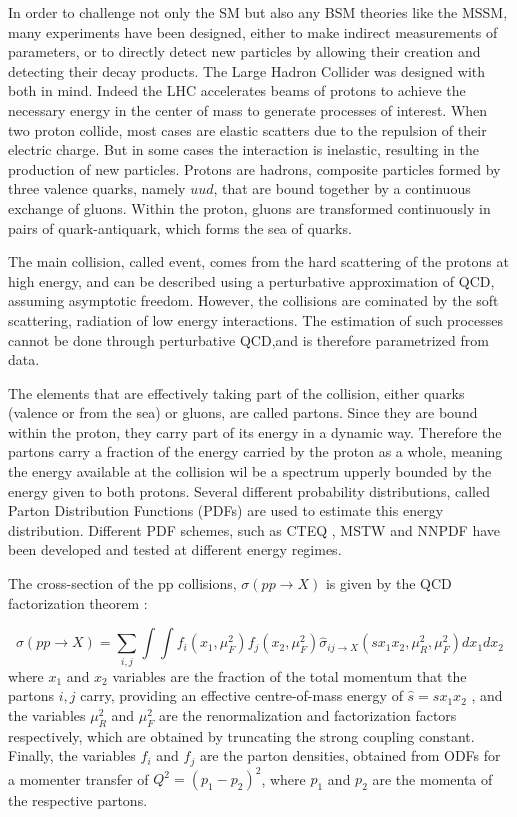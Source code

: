 In order to challenge not only the SM but also any BSM theories like the MSSM, many experiments have been designed, either to make indirect measurements of parameters, or to directly detect new particles by allowing their creation and detecting their decay products. The Large Hadron Collider was designed with both in mind. Indeed the LHC accelerates beams of protons to achieve the necessary energy in the center of mass to generate processes of interest. When two proton collide, most cases are elastic scatters due to the repulsion of their electric charge. But in some cases the interaction is inelastic, resulting in the production of new particles. Protons are hadrons, composite particles formed by three valence quarks, namely $uud$, that are bound together by a continuous exchange of gluons. Within the proton, gluons are transformed continuously in pairs of quark-antiquark, which forms the sea of quarks.

The main collision, called event, comes from the hard scattering of the protons at high energy, and can be described using a perturbative approximation of QCD, assuming asymptotic freedom. However, the collisions are cominated by the soft scattering, radiation of low energy interactions. The estimation of such processes cannot be done through perturbative QCD,and is therefore parametrized from data.

The elements that are effectively taking part of the collision, either quarks (valence or from the sea) or gluons,  are called partons. Since they are bound within the proton, they carry part of its energy in a dynamic way. Therefore the partons carry a fraction of the energy carried by the proton as a whole, meaning the energy available at the collision wil be a spectrum upperly bounded by the energy given to both protons. Several different probability distributions, called Parton Distribution Functions (PDFs) are used to estimate this energy distribution. Different PDF schemes, such as CTEQ \cite{Pumplin:2002vw}, MSTW \cite{Martin:2009iq} and NNPDF \cite{Ball:2008by} have been developed and tested at different energy regimes.

The cross-section of the pp collisions, $\sigma(pp\rightarrow X)$ is given by the QCD factorization theorem \cite{Butterworth:2012fj}:

\begin{equation}
    \sigma(pp\rightarrow X) = \sum_{i,j} \int \int f_i (x_1 , \mu_F^2 )f_j (x_2 , \mu_F^2 ) \hat{\sigma}_{ij \rightarrow X} (s x_1 x_2 , \mu_R^2 , \mu_F^2 ) dx_1 dx_2 
\end{equation}
where $x_1$ and $x_2$ variables are the fraction of the total momentum that the partons $i,j$ carry, providing an effective centre-of-mass energy of $\hat{s} = sx_1 x_2$ , and the variables $\mu_R^2$ and $\mu_F^2$ are the renormalization and factorization factors respectively, which are obtained by truncating the strong coupling constant. Finally, the variables $f_i$ and $f_j$ are the parton densities, obtained from ODFs for a momenter transfer of $Q^2 = (p_1 - p_2 )^2$, where $p_1$ and $p_2$ are the momenta of the respective partons.


